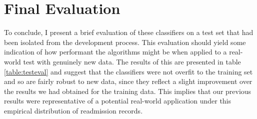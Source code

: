 \documentclass[10pt, twoside, a4paper]{article}
\begin{document}
	\section{Final Evaluation}
	To conclude, I present a brief evaluation of these classifiers on a test set that had been 
	isolated from the development process.
	This evaluation should yield some indication of how performant the algorithms might be 
	 when applied to a real-world test with genuinely new data. The results of 
	this are presented in table \ref{table:testeval} and 
	suggest that the classifiers were 
	not overfit to the training set and so are fairly robust to new data, since they reflect a 
	slight improvement over the results we had obtained 
	for the training data. This implies that our 
	previous results were 
	 representative of a potential real-world application under this empirical distribution of 
	 readmission records.

	\printbibliography
\end{document}
